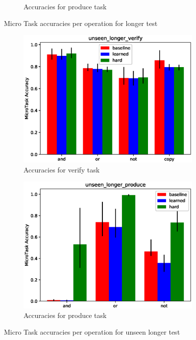 \begin{figure}[ht]
\begin{subfigure}[b]{0.5\linewidth}
		\caption{Accuracies for produce task } 
		\label{mtl2} 
		\vspace{2ex}
	\end{subfigure}
	\caption{Micro Task accuracies per operation for longer test }
	\label{mtl}
\end{figure}

\begin{figure}[ht] 
	\begin{subfigure}[b]{0.5\linewidth}
		\centering
		\includegraphics[width=0.95\linewidth]{./figs/micro/unseen_longer_verify}
		\caption{Accuracies for verify task } 
		\label{mtul1} 
		\vspace{2ex}
	\end{subfigure}%
	\begin{subfigure}[b]{0.5\linewidth}
		\centering
		\includegraphics[width=0.95\linewidth]{./figs/micro/unseen_longer_produce}
		\caption{Accuracies for produce task } 
		\label{mtul2} 
		\vspace{2ex}
	\end{subfigure}
	\caption{Micro Task accuracies per operation for unseen longer test }
	\label{mtul}
\end{figure}


